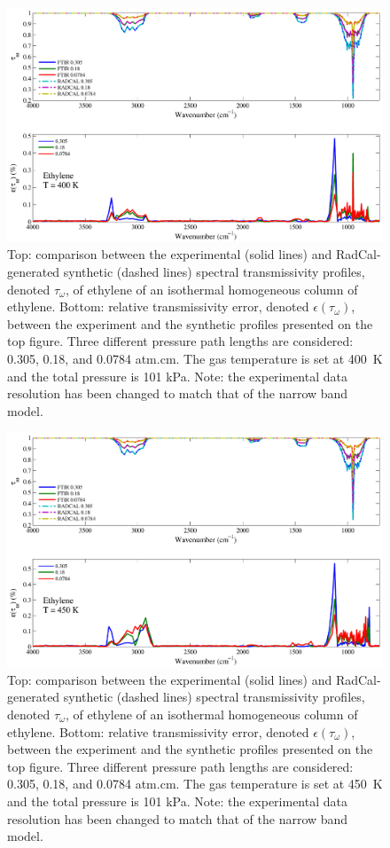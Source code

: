 \begin{figure}[p]
\includegraphics[width=\textwidth]{../Verification/Results_Test2/Ethylene_400.pdf}
\caption{Top: comparison between the experimental (solid lines) and RadCal-generated synthetic (dashed lines) spectral transmissivity profiles, denoted $\tau_{\omega}$, of ethylene of an isothermal homogeneous column of ethylene. Bottom: relative transmissivity error, denoted $\epsilon{(\tau_{\omega})}$, between the experiment and the synthetic profiles presented on the top figure. Three different pressure path lengths are considered: 0.305, 0.18, and 0.0784 atm.cm. The gas temperature is set at 400~K and the total pressure is 101 kPa. Note: the experimental data resolution has been changed to match that of the narrow band model. \label{fig:ethylene_Verify_400K}}
\end{figure}

\begin{figure}[p]
\includegraphics[width=\textwidth]{../Verification/Results_Test2/Ethylene_450.pdf}
\caption{Top: comparison between the experimental (solid lines) and RadCal-generated synthetic (dashed lines) spectral transmissivity profiles, denoted $\tau_{\omega}$, of ethylene of an isothermal homogeneous column of ethylene. Bottom: relative transmissivity error, denoted $\epsilon{(\tau_{\omega})}$, between the experiment and the synthetic profiles presented on the top figure. Three different pressure path lengths are considered: 0.305, 0.18, and 0.0784 atm.cm. The gas temperature is set at 450~K and the total pressure is 101 kPa. Note: the experimental data resolution has been changed to match that of the narrow band model. \label{fig:ethylene_Verify_450K}}
\end{figure}

